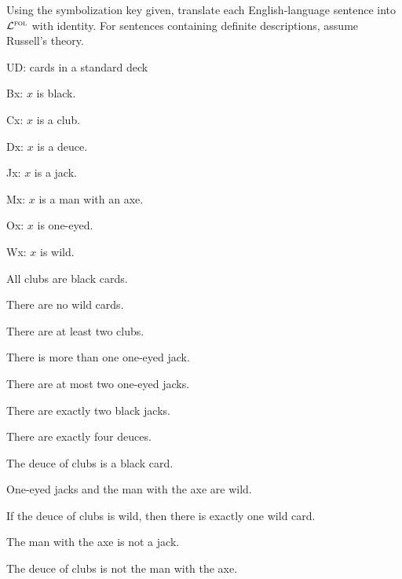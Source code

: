\solutions
\problempart
\label{pr.$\FOL$-ID-cards}
Using the symbolization key given, translate each English-language sentence into $\FOL$ with identity. For sentences containing definite descriptions, assume Russell's theory.
\begin{ekey}
\item[UD:] cards in a standard deck
\item[Bx:] $x$ is black.
\item[Cx:] $x$ is a club.
\item[Dx:] $x$ is a deuce.
\item[Jx:] $x$ is a jack.
\item[Mx:] $x$ is a man with an axe.
\item[Ox:] $x$ is one-eyed.
\item[Wx:] $x$ is wild.
\end{ekey}
\begin{earg}
\item All clubs are black cards.
\item There are no wild cards.
\item There are at least two clubs.
\item There is more than one one-eyed jack.
\item There are at most two one-eyed jacks.
\item There are exactly two black jacks.
\item There are exactly four deuces.
\item The deuce of clubs is a black card.
\item One-eyed jacks and the man with the axe are wild.
\item If the deuce of clubs is wild, then there is exactly one wild card.
\item The man with the axe is not a jack.
\item The deuce of clubs is not the man with the axe.
\end{earg}

